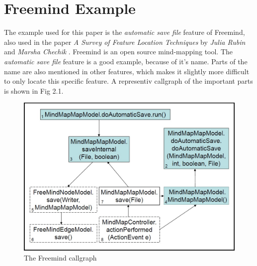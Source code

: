\chapter{Freemind Example}
\label{ch:Freemind Example}

The example used for this paper is the \textit{automatic save file} feature of Freemind, also used in the paper \emph{A Survey of Feature Location Techniques} by \textit{Julia Rubin} and \textit{Marsha Chechik} \cite{rubin2013survey}. Freemind is an open source  mind-mapping tool. The \textit{automatic save file} feature is a good example, because of it's name. Parts of the name are also mentioned in other features, which makes it slightly more difficult to only locate this specific feature.
A representiv callgraph of the important parts is shown in Fig 2.1.

\begin{figure}
  \centering
  \includegraphics[width=\linewidth]{src/pic/freemind_callgraph}
  \caption{The Freemind callgraph \cite{FrM16} \cite{rubin2013survey}}
  \label{pic:freemind callgraph}
\end{figure}

